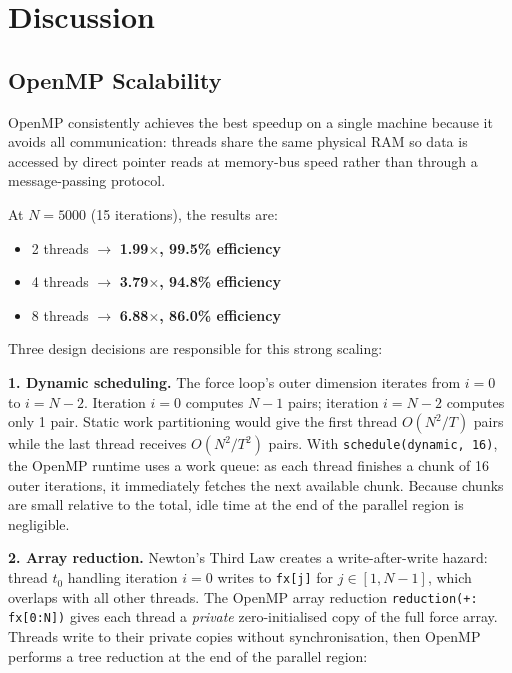 ﻿\documentclass[12pt,a4paper]{article}
\begin{document}
\section{Discussion}

\subsection{OpenMP Scalability}

OpenMP consistently achieves the best speedup on a single machine because
it avoids all communication: threads share the same physical RAM so data is
accessed by direct pointer reads at memory-bus speed rather than through
a message-passing protocol.

At $N=5000$ (15 iterations), the results are:
\begin{itemize}
    \item 2 threads $\rightarrow$ \textbf{1.99$\times$, 99.5\% efficiency}
    \item 4 threads $\rightarrow$ \textbf{3.79$\times$, 94.8\% efficiency}
    \item 8 threads $\rightarrow$ \textbf{6.88$\times$, 86.0\% efficiency}
\end{itemize}

Three design decisions are responsible for this strong scaling:

\textbf{1. Dynamic scheduling.}
The force loop's outer dimension iterates from $i=0$ to $i=N-2$. Iteration
$i=0$ computes $N-1$ pairs; iteration $i=N-2$ computes only 1 pair. Static
work partitioning would give the first thread $O(N^2/T)$ pairs while the
last thread receives $O(N^2/T^2)$ pairs. With \texttt{schedule(dynamic, 16)},
the OpenMP runtime uses a work queue: as each thread finishes a chunk of 16
outer iterations, it immediately fetches the next available chunk. Because
chunks are small relative to the total, idle time at the end of the parallel
region is negligible.

\textbf{2. Array reduction.}
Newton's Third Law creates a write-after-write hazard: thread $t_0$ handling
iteration $i=0$ writes to \texttt{fx[j]} for $j \in [1,N-1]$, which
overlaps with all other threads. The OpenMP array reduction
\texttt{reduction(+: fx[0:N])} gives each thread a \emph{private}
zero-initialised copy of the full force array. Threads write to their private
copies without synchronisation, then OpenMP performs a tree reduction at the
end of the parallel region:
\end{document}
